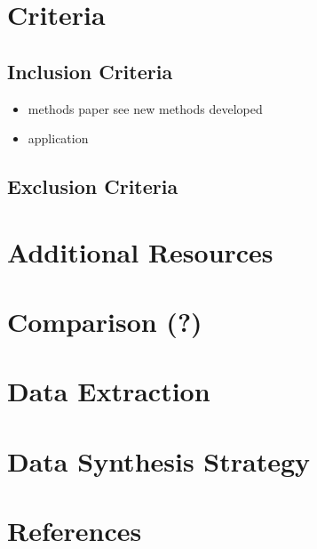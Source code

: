 \documentclass[
]{article}
\begin{document}
\hypertarget{criteria}{%
\section{Criteria}\label{criteria}}

\hypertarget{inclusion-criteria}{%
\subsection{Inclusion Criteria}\label{inclusion-criteria}}

\begin{itemize}
\item
  methods paper see new methods developed
\item
  application
\end{itemize}

\hypertarget{exclusion-criteria}{%
\subsection{Exclusion Criteria}\label{exclusion-criteria}}

\hypertarget{additional-resources}{%
\section{Additional Resources}\label{additional-resources}}

\hypertarget{comparison}{%
\section{Comparison (?)}\label{comparison}}

\hypertarget{data-extraction}{%
\section{Data Extraction}\label{data-extraction}}

\hypertarget{data-synthesis-strategy}{%
\section{Data Synthesis Strategy}\label{data-synthesis-strategy}}

\hypertarget{references}{%
\section{References}\label{references}}
\end{document}
